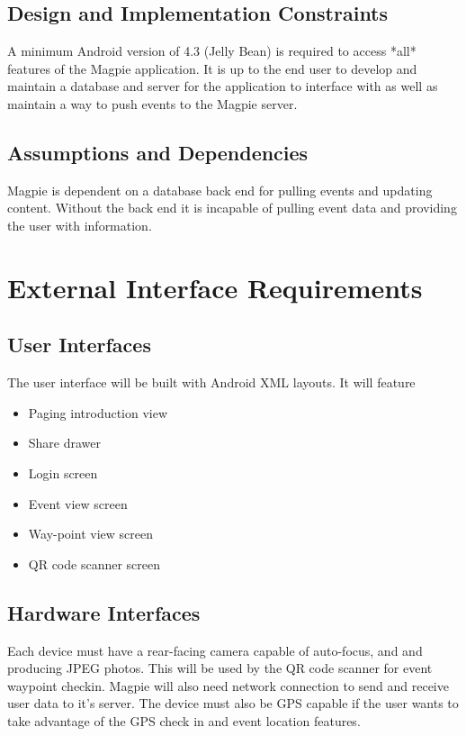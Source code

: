 \documentclass{scrreprt}
\begin{document}
\section{Design and Implementation Constraints}
A minimum Android version of 4.3 (Jelly Bean) is required to access *all* features of the Magpie application. It is up to the end user to develop and maintain a database and server for the application to interface with as well as maintain a way to push events to the Magpie server.

\section{Assumptions and Dependencies}
Magpie is dependent on a database back end for pulling events and updating
content. Without the back end it is incapable of pulling event data and
providing the user with information.


\chapter{External Interface Requirements}

\section{User Interfaces}

The user interface will be built with Android XML layouts. It will feature
\begin{itemize}
\item Paging introduction view
\item Share drawer
\item Login screen
\item Event view screen
\item Way-point view screen
\item QR code scanner screen
\end{itemize}

\section{Hardware Interfaces}
Each device must have a rear-facing camera capable of auto-focus,
and and producing JPEG photos. This will be used by the QR code scanner for event waypoint checkin.
Magpie will also need network connection to send and receive user data to it's server.
The device must also be GPS capable if the user wants to take advantage of the GPS check in and event location features.
\end{document}
